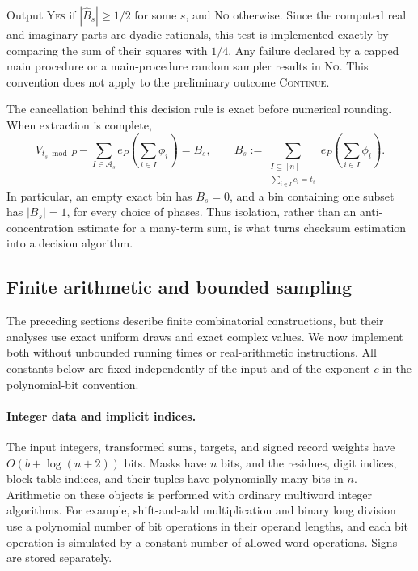 Output \textsc{Yes} if $|\widehat B_s|\ge 1/2$ for some $s$, and
\textsc{No} otherwise.  Since the computed real and imaginary parts are
dyadic rationals, this test is implemented exactly by comparing the sum of
their squares with $1/4$.  Any failure declared by a capped main procedure
or a main-procedure random sampler results in \textsc{No}.  This convention
does not apply to the preliminary outcome \textsc{Continue}.

The cancellation behind this decision rule is exact before numerical
rounding.  When extraction is complete,
\begin{equation}
 V_{t_s\bmod P}
 -\sum_{I\in\mathcal A_s}e_P\left(\sum_{i\in I}\phi_i\right)
 = B_s,
 \qquad
 B_s:=\sum_{\substack{I\subseteq[n]\\\sum_{i\in I}c_i=t_s}}
             e_P\left(\sum_{i\in I}\phi_i\right).
 \label{eq:exact-bin-checksum}
\end{equation}
In particular, an empty exact bin has $B_s=0$, and a bin containing one
subset has $|B_s|=1$, for every choice of phases.  Thus isolation, rather
than an anti-concentration estimate for a many-term sum, is what turns
checksum estimation into a decision algorithm.

\subsection{Finite arithmetic and bounded sampling}
\label{sec:finite-arithmetic}

The preceding sections describe finite combinatorial constructions, but
their analyses use exact uniform draws and exact complex values.  We now
implement both without unbounded running times or real-arithmetic
instructions.  All constants below are fixed independently of the input
and of the exponent $c$ in the polynomial-bit convention.

\paragraph{Integer data and implicit indices.}
The input integers, transformed sums, targets, and signed record weights
have $O(b+\log(n+2))$ bits.  Masks have $n$ bits, and the residues, digit
indices, block-table indices, and their tuples have polynomially many
bits in $n$.  Arithmetic on these objects is performed with ordinary
multiword integer algorithms.  For example, shift-and-add multiplication
and binary long division use a polynomial number of bit operations in
their operand lengths, and each bit operation is simulated by a constant
number of allowed word operations.  Signs are stored separately.


